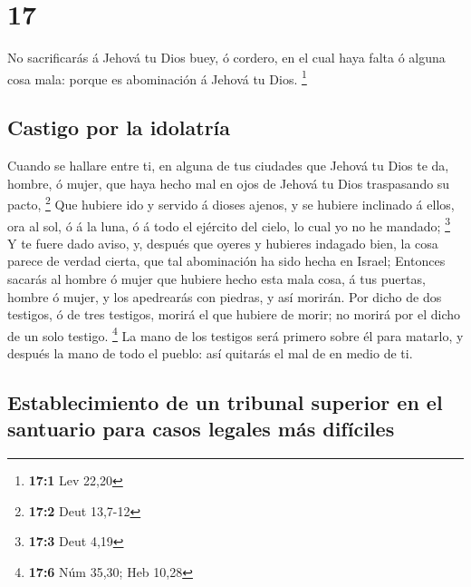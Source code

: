 \hypertarget{section-16}{%
\section{17}\label{section-16}}

 No sacrificarás á Jehová tu Dios buey, ó cordero, en el
cual haya falta ó alguna cosa mala: porque es abominación á Jehová tu
Dios. \footnote{\textbf{17:1} Lev 22,20}

\hypertarget{castigo-por-la-idolatruxeda}{%
\subsection{Castigo por la
idolatría}\label{castigo-por-la-idolatruxeda}}

 Cuando se hallare entre ti, en alguna de tus ciudades que
Jehová tu Dios te da, hombre, ó mujer, que haya hecho mal en ojos de
Jehová tu Dios traspasando su pacto, \footnote{\textbf{17:2} Deut
  13,7-12}  Que hubiere ido y servido á dioses ajenos, y se
hubiere inclinado á ellos, ora al sol, ó á la luna, ó á todo el ejército
del cielo, lo cual yo no he mandado; \footnote{\textbf{17:3} Deut 4,19}
 Y te fuere dado aviso, y, después que oyeres y hubieres
indagado bien, la cosa parece de verdad cierta, que tal abominación ha
sido hecha en Israel;  Entonces sacarás al hombre ó mujer
que hubiere hecho esta mala cosa, á tus puertas, hombre ó mujer, y los
apedrearás con piedras, y así morirán.  Por dicho de dos
testigos, ó de tres testigos, morirá el que hubiere de morir; no morirá
por el dicho de un solo testigo. \footnote{\textbf{17:6} Núm 35,30; Heb
  10,28}  La mano de los testigos será primero sobre él para
matarlo, y después la mano de todo el pueblo: así quitarás el mal de en
medio de ti.

\hypertarget{establecimiento-de-un-tribunal-superior-en-el-santuario-para-casos-legales-muxe1s-difuxedciles}{%
\subsection{Establecimiento de un tribunal superior en el santuario para
casos legales más
difíciles}\label{establecimiento-de-un-tribunal-superior-en-el-santuario-para-casos-legales-muxe1s-difuxedciles}}

